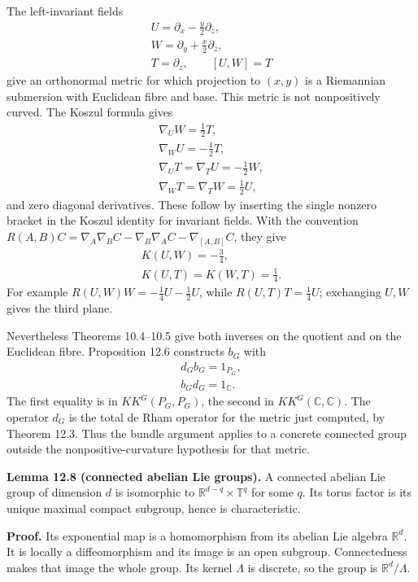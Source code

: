 \documentclass[
  11pt,
]{article}
\begin{document}
The left-invariant fields \[
\begin{gathered}
U=\partial_x-\tfrac y2\partial_z,\\
W=\partial_y+\tfrac x2\partial_z,\\
T=\partial_z,\qquad [U,W]=T
\end{gathered}
\tag{12.28}
\] give an orthonormal metric for which projection to \((x,y)\) is a
Riemannian submersion with Euclidean fibre and base. This metric is not
nonpositively curved. The Koszul formula gives \[
\begin{gathered}
\nabla_UW=\tfrac12T,\\
\nabla_WU=-\tfrac12T,\\
\nabla_UT=\nabla_TU=-\tfrac12W,\\
\nabla_WT=\nabla_TW=\tfrac12U,
\end{gathered}
\tag{12.29}
\] and zero diagonal derivatives. These follow by inserting the single
nonzero bracket in the Koszul identity for invariant fields. With the
convention
\(R(A,B)C=\nabla_A\nabla_BC-\nabla_B\nabla_AC-\nabla_{[A,B]}C\), they
give \[
\begin{gathered}
K(U,W)=-\tfrac34,\\
K(U,T)=K(W,T)=\tfrac14.
\end{gathered}
\tag{12.30}
\] For example \(R(U,W)W=-\tfrac14U-\tfrac12U\), while
\(R(U,T)T=\tfrac14U\); exchanging \(U,W\) gives the third plane.

Nevertheless Theorems 10.4--10.5 give both inverses on the quotient and
on the Euclidean fibre. Proposition 12.6 constructs \(b_G\) with \[
\begin{gathered}
d_Gb_G=1_{P_G},\\
b_Gd_G=1_{\mathbb C}.
\end{gathered}
\tag{12.31}
\] The first equality is in \(KK^G(P_G,P_G)\), the second in
\(KK^G(\mathbb C,\mathbb C)\). The operator \(d_G\) is the total de Rham
operator for the metric just computed, by Theorem 12.3. Thus the bundle
argument applies to a concrete connected group outside the
nonpositive-curvature hypothesis for that metric.

\textbf{Lemma 12.8 (connected abelian Lie groups).} A connected abelian
Lie group of dimension \(d\) is isomorphic to
\(\mathbb R^{d-q}\times\mathbb T^q\) for some \(q\). Its torus factor is
its unique maximal compact subgroup, hence is characteristic.

\textbf{Proof.} Its exponential map is a homomorphism from its abelian
Lie algebra \(\mathbb R^d\). It is locally a diffeomorphism and its
image is an open subgroup. Connectedness makes that image the whole
group. Its kernel \(\Lambda\) is discrete, so the group is
\(\mathbb R^d/\Lambda\).
\end{document}
